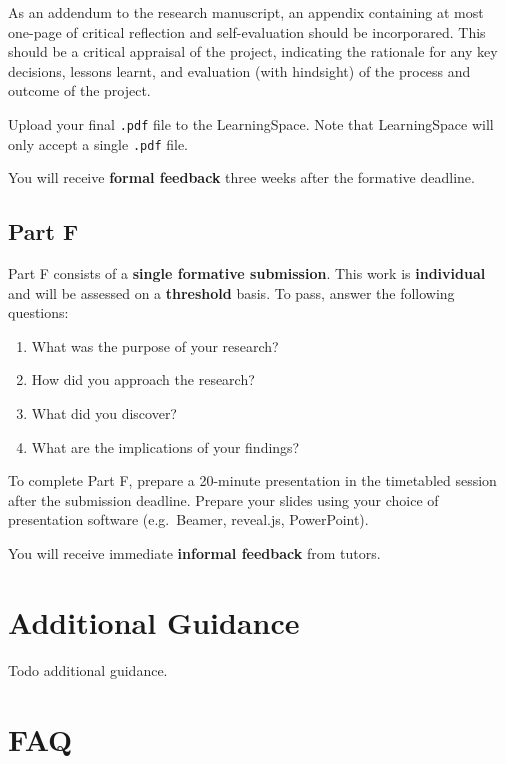 \documentclass{../fal_assignment}
\begin{document}
As an addendum to the research manuscript, an appendix containing at most one-page of critical reflection and self-evaluation should be incorporared. 
This should be a critical appraisal of the project, indicating the rationale for any key decisions, lessons learnt, and evaluation (with hindsight) of the process
and outcome of the project. 

Upload your final \texttt{.pdf} file to the LearningSpace.
Note that LearningSpace will only accept a single \texttt{.pdf} file.

You will receive \textbf{formal feedback} three weeks after the formative deadline.

\subsection*{Part F}

Part F consists of a \textbf{single formative submission}.
This work is \textbf{individual} and will be assessed on a \textbf{threshold} basis.
To pass, answer the following questions:

\begin{enumerate}[label=(\roman*)]
	\item What was the purpose of your research?
	\item How did you approach the research?
	\item What did you discover?
	\item What are the implications of your findings?
\end{enumerate}

To complete Part F, prepare a 20-minute presentation in the timetabled session after the submission deadline.
Prepare your slides using your choice of presentation software (e.g.\ Beamer, reveal.js, PowerPoint).

You will receive immediate \textbf{informal feedback} from tutors.

\section*{Additional Guidance}

Todo additional guidance.

\section*{FAQ}
\end{document}
